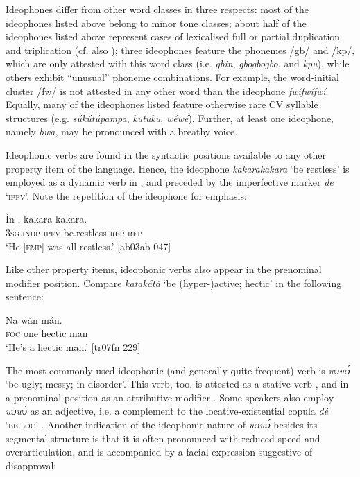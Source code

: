 Ideophones differ from other word classes in three respects: most of the ideophones listed above belong to minor tone classes; about half of the ideophones listed above represent cases of lexicalised full or partial duplication and triplication (cf. also ); three ideophones feature the phonemes /gb/ and /kp/, which are only attested with this word class (i.e. \textit{gbin}, \textit{gbogbogbo}, and \textit{kpu}), while others exhibit “unusual” phoneme combinations. For example, the word-initial cluster /fw/ is not attested in any other word than the ideophone \textit{fwífwífwí}. Equally, many of the ideophones listed feature otherwise rare CV syllable structures (e.g. \textit{súkútúpampa}, \textit{kutuku}, \textit{wéwé}). Further, at least one ideophone, namely \textit{bwa}, may be pronounced with a breathy voice. 


Ideophonic verbs are found in the syntactic positions available to any other property item of the language. Hence, the ideophone \textit{kakarakakara} ‘be restless’ is employed as a dynamic verb in , and preceded by the imperfective marker \textit{de} ‘\textsc{ipfv}’. Note the repetition of the ideophone for emphasis: 



\ea%
    \label{ex:key:1624}
    \gll \'{I}n      ,    kakara  kakara.\\
\textsc{3sg.indp}  \textsc{ipfv}  be.restless  \textsc{rep}    \textsc{rep}\\

\glt ‘He [\textsc{emp}] was all restless.’ [ab03ab 047]
\z

Like other property items, ideophonic verbs also appear in the prenominal modifier position. Compare \textit{katakátá} ‘be (hyper-)active; hectic’ in the following sentence: 


\ea%
    \label{ex:key:1625}
    \gll Na  wán      mán.\\
\textsc{foc}  one    hectic    man\\

\glt ‘He’s a hectic man.’ [tr07fn 229]
\z

The most commonly used ideophonic (and generally quite frequent) verb is \textit{wɔwɔ́} ‘be ugly; messy; in disorder’. This verb, too, is attested as a stative verb , and in a prenominal position as an attributive modifier . Some speakers also employ \textit{wɔwɔ́} as an adjective, i.e. a complement to the locative-existential copula \textit{dé} \textsc{‘be.loc’} . Another indication of the ideophonic nature of \textit{wɔwɔ́} besides its segmental structure is that it is often pronounced with reduced speed and overarticulation, and is accompanied by a facial expression suggestive of disapproval:


